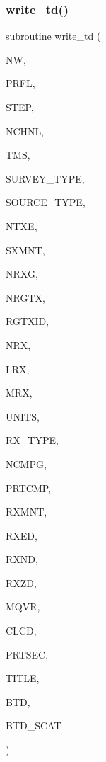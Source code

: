 \subsubsection{\texorpdfstring{write\+\_\+td()}{write\_td()}}
{\footnotesize\ttfamily subroutine write\+\_\+td (\begin{DoxyParamCaption}\item[{integer}]{NW,  }\item[{integer}]{P\+R\+FL,  }\item[{integer}]{S\+T\+EP,  }\item[{integer}]{N\+C\+H\+NL,  }\item[{real, dimension(nchnl)}]{T\+MS,  }\item[{integer}]{S\+U\+R\+V\+E\+Y\+\_\+\+T\+Y\+PE,  }\item[{integer}]{S\+O\+U\+R\+C\+E\+\_\+\+T\+Y\+PE,  }\item[{integer}]{N\+T\+XE,  }\item[{real, dimension(ntxe)}]{S\+X\+M\+NT,  }\item[{integer}]{N\+R\+XG,  }\item[{integer, dimension(ntxe)}]{N\+R\+G\+TX,  }\item[{integer, dimension(nrxg,ntxe)}]{R\+G\+T\+X\+ID,  }\item[{integer, dimension(nrxg)}]{N\+RX,  }\item[{integer}]{L\+RX,  }\item[{integer}]{M\+RX,  }\item[{integer, dimension(nrxg)}]{U\+N\+I\+TS,  }\item[{integer, dimension(nrxg)}]{R\+X\+\_\+\+T\+Y\+PE,  }\item[{integer, dimension(nrxg)}]{N\+C\+M\+PG,  }\item[{integer, dimension(10,nrxg)}]{P\+R\+T\+C\+MP,  }\item[{real, dimension(mrx,nrxg)}]{R\+X\+M\+NT,  }\item[{real(kind=8), dimension (mrx,nrxg,mqvr)}]{R\+X\+ED,  }\item[{real(kind=8), dimension (mrx,nrxg,mqvr)}]{R\+X\+ND,  }\item[{real(kind=8), dimension (mrx,nrxg,mqvr)}]{R\+X\+ZD,  }\item[{integer}]{M\+Q\+VR,  }\item[{real(kind=8), dimension(3,ntxe)}]{C\+L\+CD,  }\item[{logical}]{P\+R\+T\+S\+EC,  }\item[{character(len=120)}]{T\+I\+T\+LE,  }\item[{real, dimension(nchnl,lrx,ntxe,3)}]{B\+TD,  }\item[{real, dimension(nchnl,lrx,ntxe,3)}]{B\+T\+D\+\_\+\+S\+C\+AT }\end{DoxyParamCaption})}

